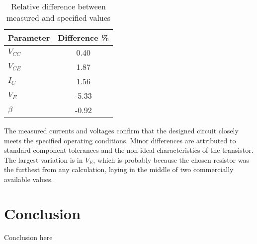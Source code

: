 \documentclass{article}
\begin{document}
\begin{table}[H]
    \centering
    \caption{Relative difference between measured and specified values}
    \begin{tabular}{l S[table-format=3.2]}
        \toprule
        Parameter & {Difference \%} \\
        \midrule
        \(V_{CC}\)  &  0.40 \\
        \(V_{CE}\)  &  1.87 \\
        \(I_C\)     &  1.56 \\
        \(V_E\)     & -5.33 \\
        \(\beta\)   & -0.92 \\
        \bottomrule
    \end{tabular}%
    \label{tab:4diff}%
\end{table}%

The measured currents and voltages confirm that the designed circuit closely meets the specified operating conditions.  
Minor differences are attributed to standard component tolerances and the non-ideal characteristics of the transistor.
The largest variation is in \(V_E\), which is probably because the chosen resistor was the furthest from any calculation, laying in the middle of two commercially available values.



\section{Conclusion}
Conclusion here


\end{document}
